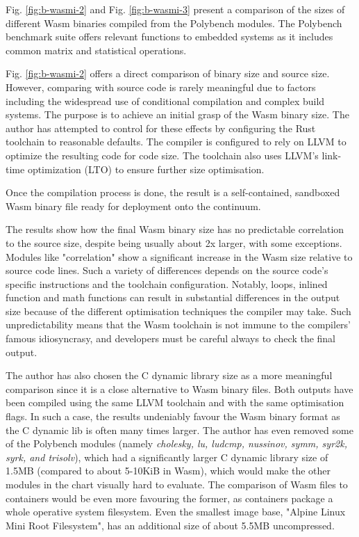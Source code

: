 Fig. \ref{fig:b-wasmi-2} and Fig. \ref{fig:b-wasmi-3} present a comparison of the sizes of different Wasm binaries compiled from the Polybench \cite{yuki2014understanding} modules. The Polybench benchmark suite offers relevant functions to embedded systems as it includes common matrix and statistical operations.

Fig. \ref{fig:b-wasmi-2} offers a direct comparison of binary size and source size. However, comparing with source code is rarely meaningful due to factors including the widespread use of conditional compilation and complex build systems. The purpose is to achieve an initial grasp of the Wasm binary size. The author has attempted to control for these effects by configuring the Rust toolchain to reasonable defaults. The compiler is configured to rely on LLVM to optimize the resulting code for code size. The toolchain also uses LLVM's link-time optimization (LTO) to ensure further size optimisation.

Once the compilation process is done, the result is a self-contained, sandboxed Wasm binary file ready for deployment onto the continuum.

The results show how the final Wasm binary size has no predictable correlation to the source size, despite being usually about 2x larger, with some exceptions. Modules like "correlation" show a significant increase in the Wasm size relative to source code lines. Such a variety of differences depends on the source code's specific instructions and the toolchain configuration. Notably, loops, inlined function and math functions can result in substantial differences in the output size because of the different optimisation techniques the compiler may take. Such unpredictability means that the Wasm toolchain is not immune to the compilers' famous idiosyncrasy, and developers must be careful always to check the final output.

The author has also chosen the C dynamic library size as a more meaningful comparison since it is a close alternative to Wasm binary files. Both outputs have been compiled using the same LLVM toolchain and with the same optimisation flags. In such a case, the results undeniably favour the Wasm binary format as the C dynamic lib is often many times larger. The author has even removed some of the Polybench modules (namely \emph{cholesky, lu, ludcmp, nussinov, symm, syr2k, syrk, and trisolv}), which had a significantly larger C dynamic library size of 1.5MB (compared to about 5-10KiB in Wasm), which would make the other modules in the chart visually hard to evaluate. The comparison of Wasm files to containers would be even more favouring the former, as containers package a whole operative system filesystem. Even the smallest image base, "Alpine Linux Mini Root Filesystem", has an additional size of about 5.5MB uncompressed.

